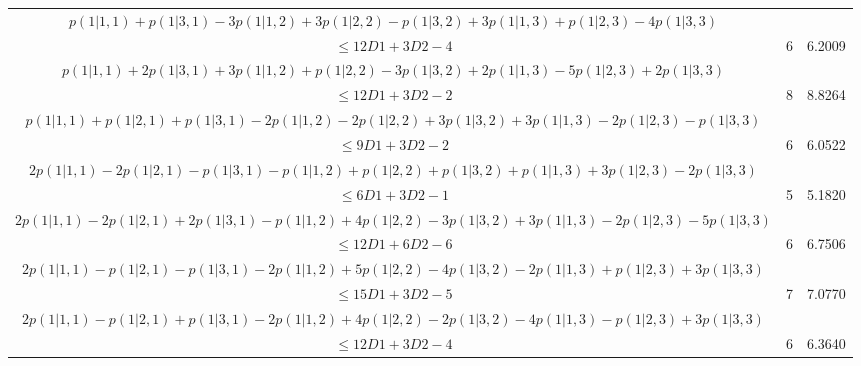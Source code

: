 \documentclass[11pt]{article}
\begin{document}
\begin{table}[htbp]
{\begin{tabular}{|c|c|c|}
    $p(1|1,1) +p(1|3,1) -3p(1|1,2) +3p(1|2,2) -p(1|3,2) +3p(1|1,3) +p(1|2,3) -4p(1|3,3)$&&\\$ \leqslant 12D1 +3D2  -4$ & 6 & 6.2009\\ \hline

    $p(1|1,1) +2p(1|3,1) +3p(1|1,2) +p(1|2,2) -3p(1|3,2) +2p(1|1,3) -5p(1|2,3) +2p(1|3,3)$&&\\$ \leqslant 12D1 +3D2  -2$ &8 & 8.8264\\ \hline

    $p(1|1,1) +p(1|2,1) +p(1|3,1) -2p(1|1,2) -2p(1|2,2) +3p(1|3,2) +3p(1|1,3) -2p(1|2,3) -p(1|3,3)$&&\\$ \leqslant 9D1 +3D2  -2$ &6 & 6.0522\\ \hline

    $2p(1|1,1) -2p(1|2,1) -p(1|3,1) -p(1|1,2) +p(1|2,2) +p(1|3,2) +p(1|1,3) +3p(1|2,3) -2p(1|3,3)$&&\\$ \leqslant 6D1 +3D2  -1$ &5 & 5.1820 \\ \hline

    $2p(1|1,1) -2p(1|2,1) +2p(1|3,1) -p(1|1,2) +4p(1|2,2) -3p(1|3,2) +3p(1|1,3) -2p(1|2,3) -5p(1|3,3)$&&\\$ \leqslant 12D1 +6D2 -6$&6 & 6.7506\\ \hline

    $2p(1|1,1) -p(1|2,1) -p(1|3,1) -2p(1|1,2) +5p(1|2,2) -4p(1|3,2) -2p(1|1,3) +p(1|2,3) +3p(1|3,3)$&&\\$ \leqslant 15D1 + 3D2 -5$& 7 & 7.0770 \\ \hline
$2p(1|1,1) -p(1|2,1) +p(1|3,1) -2p(1|1,2) +4p(1|2,2) -2p(1|3,2) -4p(1|1,3) -p(1|2,3) +3p(1|3,3)$&&\\$ \leqslant 12D1 +3D2 -4$ & 6 & 6.3640\\ \hline
    
    \end{tabular}
}
\end{table}
\end{document}
